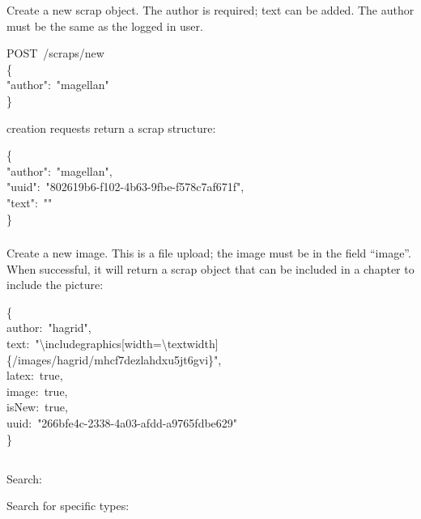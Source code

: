 \documentclass[onecolumn, draftclsnofoot, 10pt, compsoc]{IEEEtran}
\begin{document}
\noindent Create a new scrap object. The author is required; text
can be added. The author must be the same as the logged in user.%
\begin{mdpre}%
\noindent POST~/scraps/new\\
\{\\
"author":~"magellan"\\
\}%
\end{mdpre}\noindent{} creation requests return a scrap structure:
\begin{mdpre}%
\noindent\{\\
"author":~"magellan",\\
"uuid":~"802619b6-f102-4b63-9fbe-f578c7af671f",\\
"text":~""\\
\}%
\end{mdpre}
\subsubsection{}\label{sec-post-imagesnew}%

\noindent Create a new image. This is a  file upload; the image must
be in the field \textquotedblleft{}image\textquotedblright{}. When successful, it will return a scrap object that
can be included in a chapter to include the picture:%
\begin{mdpre}%
\noindent\{\\
author:~"hagrid",\\
text:~"\textbackslash{}includegraphics{}[width=\textbackslash{}textwidth]\{/images/hagrid/mhcf7dezlahdxu5jt6gvi\}",\\
latex:~true,\\
image:~true,\\
isNew:~true,\\
uuid:~"266bfe4c-2338-4a03-afdd-a9765fdbe629"\\
\}%
\end{mdpre}
\subsection{}\label{sec-search}%

\noindent Search:\mdbr
{}%

Search for specific types:\mdbr
{}\mdbr
{}\mdbr
{}%
\end{document}
